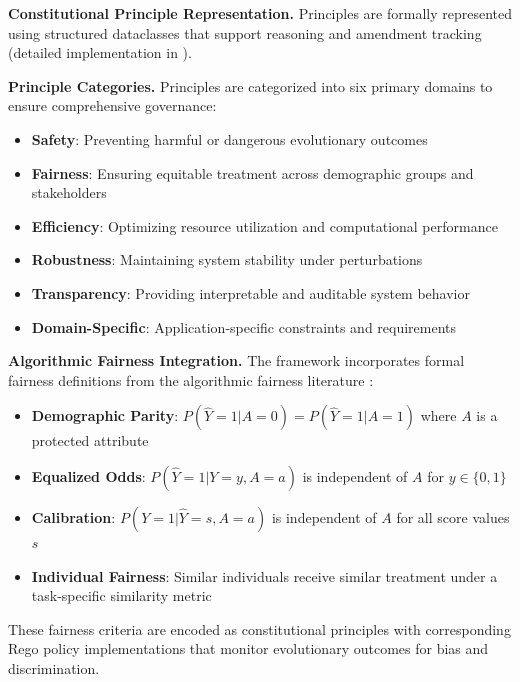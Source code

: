 \documentclass[sigconf,natbib]{acmart}
\begin{document}
\textbf{Constitutional Principle Representation.} Principles are formally represented using structured dataclasses that support reasoning and amendment tracking (detailed implementation in ).

\textbf{Principle Categories.} Principles are categorized into six primary domains to ensure comprehensive governance:

\begin{itemize}
    \item \textbf{Safety}: Preventing harmful or dangerous evolutionary outcomes
    \item \textbf{Fairness}: Ensuring equitable treatment across demographic groups and stakeholders
    \item \textbf{Efficiency}: Optimizing resource utilization and computational performance
    \item \textbf{Robustness}: Maintaining system stability under perturbations
    \item \textbf{Transparency}: Providing interpretable and auditable system behavior
    \item \textbf{Domain-Specific}: Application-specific constraints and requirements
\end{itemize}

\textbf{Algorithmic Fairness Integration.} The framework incorporates formal fairness definitions from the algorithmic fairness literature \cite{Barocas2023FairnessML, Hardt2016EqualityOpportunity, Chouldechova2017FairPrediction}:

\begin{itemize}
    \item \textbf{Demographic Parity}: $P(\hat{Y} = 1 | A = 0) = P(\hat{Y} = 1 | A = 1)$ where $A$ is a protected attribute
    \item \textbf{Equalized Odds}: $P(\hat{Y} = 1 | Y = y, A = a)$ is independent of $A$ for $y \in \{0,1\}$
    \item \textbf{Calibration}: $P(Y = 1 | \hat{Y} = s, A = a)$ is independent of $A$ for all score values $s$
    \item \textbf{Individual Fairness}: Similar individuals receive similar treatment under a task-specific similarity metric
\end{itemize}

These fairness criteria are encoded as constitutional principles with corresponding Rego policy implementations that monitor evolutionary outcomes for bias and discrimination.
\end{document}

